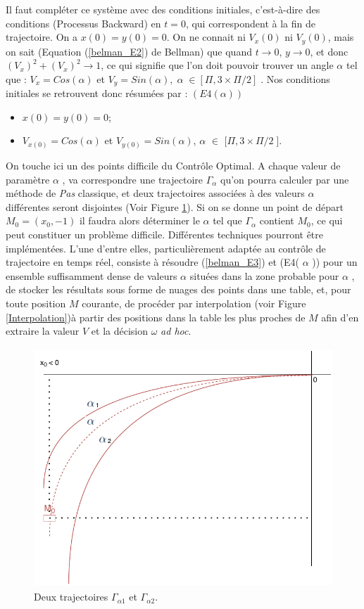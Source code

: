 {Il faut compléter ce système avec des conditions initiales, c'est-à-dire des conditions (Processus Backward) en $t = 0$, qui correspondent à la fin de trajectoire. On a $x(0) = y(0) = 0$. On ne connait ni $V_x(0)$ ni $V_y(0)$, mais on sait (Equation (\ref{belman_E2}) de Bellman) que quand $t \rightarrow 0$, $y \rightarrow 0$, et donc $(V_x)^2+ (V_x)^2 \rightarrow 1$, ce qui signifie que l'on doit pouvoir trouver un angle  $\alpha$  tel que : $V_x = Cos( \alpha)$ et $V_y = Sin( \alpha), \alpha \in [\Pi,3\times \Pi/2]$. Nos conditions initiales se retrouvent donc résumées par :		$(E4( \alpha ))$
\begin{itemize}[label=$\square$]
	\item $	x(0) = y(0) = 0 $;
	\item	$V_{x(0)} = Cos(\alpha)$ et $V_{y(0)}  = Sin(\alpha)$, $\alpha$ $\in$ [$\Pi, 3 \times \Pi/2$].
\end{itemize}
On touche ici un des points difficile du Contrôle Optimal. A chaque valeur de paramètre  $\alpha$ , va correspondre une trajectoire $\Gamma_\alpha$  qu'on pourra calculer par une méthode de \textit{Pas} classique, et deux trajectoires associées à des valeurs  $\alpha$  différentes seront disjointes (Voir Figure \ref{Deux_trajectoires}).  Si on se donne un point de départ $M_0 = (x_0, -1)$ il faudra alors déterminer le  $\alpha$  tel que  $\Gamma_\alpha$  contient $M_0$, ce qui peut constituer un problème difficile. Différentes techniques pourront être implémentées. L'une d'entre elles, particulièrement adaptée au contrôle de trajectoire en temps réel, consiste à résoudre (\ref{belman_E3}) et (E4( $\alpha$ )) pour un ensemble suffisamment dense de valeurs  $\alpha$  situées dans la zone probable pour   $\alpha$ , de stocker les résultats sous forme de nuages des points dans une table,  et, pour toute position $M$ courante, de procéder par interpolation (voir Figure \ref{Interpolation})à partir des positions dans la table les plus proches de $M$ afin d'en extraire la valeur $V$ et la décision $\omega$ \textit{ad hoc}.


\begin{figure}[H]
	\centerline{
		\includegraphics[height=9cm]{images_these/Deux_trajectoires.pdf}}
	\caption[Deux trajectoires. ]{Deux trajectoires $\Gamma_{\alpha1}$ et $\Gamma_{\alpha2}$.}
	\label{Deux_trajectoires}
\end{figure}

}

